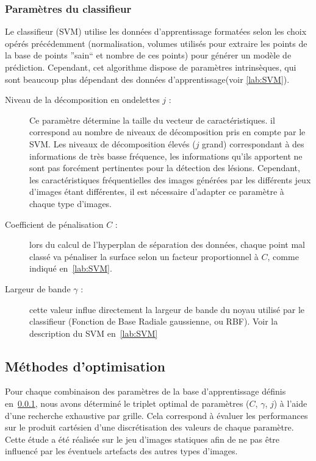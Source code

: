 \subsubsection{Paramètres du classifieur}
\label{lab:paramClassif}
Le classifieur (SVM) utilise les données d'apprentissage formatées selon les choix opérés précédemment (normalisation, volumes utilisés pour extraire les points de la base de points ''sain`` et nombre de ces points) pour générer un modèle de prédiction. Cependant, cet algorithme dispose de paramètres intrinsèques, qui sont beaucoup plus dépendant des données d'apprentissage(voir \ref{lab:SVM}).

\begin{description}
 \item[Niveau de la décomposition en ondelettes $j$ :] Ce paramètre détermine la taille du vecteur de caractéristiques. il correspond au nombre de niveaux de décomposition pris en compte par le SVM. Les niveaux de décomposition élevés ($j$ grand) correspondant à des informations de très basse fréquence, les informations qu'ils apportent ne sont pas forcément pertinentes pour la détection des lésions. Cependant, les caractéristiques fréquentielles des images générées par les différents jeux d'images étant différentes, il est nécessaire d'adapter ce paramètre à chaque type d'images.
 \item[Coefficient de pénalisation $C$ :] lors du calcul de l'hyperplan de séparation des données, chaque point mal classé va pénaliser la surface selon un facteur proportionnel à $C$, comme indiqué en~\ref{lab:SVM}.
 \item[Largeur de bande $\gamma$ :] cette valeur influe directement la largeur de bande du noyau utilisé par le classifieur (Fonction de Base Radiale gaussienne, ou RBF). Voir la description du SVM en~\ref{lab:SVM}
\end{description}

\subsection{Méthodes d'optimisation}
\label{lab:optimCGJ}

Pour chaque combinaison des paramètres de la base d'apprentissage définis en~\ref{lab:paramClassif}, nous avons déterminé le triplet optimal de paramètres ($C$, $\gamma$, $j$) à l'aide d'une recherche exhaustive par grille. Cela correspond à évaluer les performances sur le produit cartésien d'une discrétisation des valeurs de chaque paramètre. Cette étude a été réalisée sur le jeu d'images statiques afin de ne pas être influencé par les éventuels artefacts des autres types d'images.

